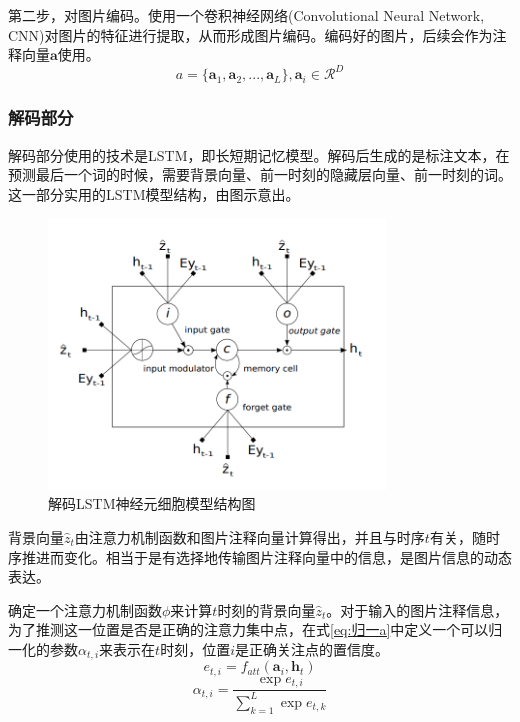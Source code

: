 第二步，对图片编码。使用一个卷积神经网络(Convolutional Neural Network, CNN)对图片的特征进行提取，从而形成图片编码。编码好的图片，后续会作为注释向量$\textbf{a}$使用。
$$a = \{\textbf{a}_1, \textbf{a}_2, ... , \textbf{a}_L\}, \textbf{a}_i \in \mathcal{R}^D$$

\subsubsection{解码部分}
解码部分使用的技术是LSTM，即长短期记忆模型。解码后生成的是标注文本，在预测最后一个词的时候，需要背景向量、前一时刻的隐藏层向量、前一时刻的词。这一部分实用的LSTM模型结构，由图示意出。
\begin{figure}[!htbp]
    \centering
    \includegraphics[width=0.8\textwidth]{figures/lstm_token.png}
    \caption{解码LSTM神经元细胞模型结构图}
    \label{fig:lstm_tokenize}
\end{figure}

背景向量$\hat{z}_t$由注意力机制函数和图片注释向量计算得出，并且与时序$t$有关，随时序推进而变化。相当于是有选择地传输图片注释向量中的信息，是图片信息的动态表达。

确定一个注意力机制函数$\phi$来计算$t$时刻的背景向量$\hat{z}_t$。对于输入的图片注释信息，为了推测这一位置是否是正确的注意力集中点，在式\eqref{eq:归一a}中定义一个可以归一化的参数$\alpha_{t,i}$来表示在$t$时刻，位置$i$是正确关注点的置信度。
\begin{equation}
    e_{t,i}=f_{att}(\textbf{a}_i,\textbf{h}_t)
\end{equation}
\begin{equation}
    \label{eq:归一a}
    \alpha_{t,i}=\frac{\exp e_{t,i}}{\sum_{k=1}^{L}\exp e_{t,k}}
\end{equation}

